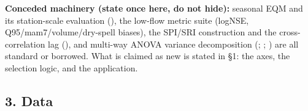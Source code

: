 \documentclass[
  english,
  11pt,
]{article}
\begin{document}
\textbf{Conceded machinery (state once here, do not hide):} seasonal EQM
and its station-scale evaluation
(), the
low-flow metric suite (logNSE, Q95/mam7/volume/dry-spell biases), the
SPI/SRI construction and the cross-correlation lag
(), and
multi-way ANOVA variance decomposition (; ;
) are all standard
or borrowed. What is claimed as new is stated in §1: the axes, the
selection logic, and the application.

\subsection{3. Data}\label{data}
\end{document}
